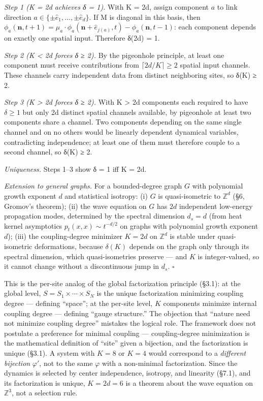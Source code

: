 \documentclass[
  11pt,
]{article}
\begin{document}
\emph{Step 1 (K = 2d achieves δ = 1).} With K = 2d, assign component
\(a\) to link direction
\(a \in \{\pm\hat{e}_1, \ldots, \pm\hat{e}_d\}\). If M is diagonal in
this basis, then
\(\phi_a(\mathbf{n}, t+1) = \mu_a \cdot \phi_a(\mathbf{n} + \hat{e}_{j(a)}, t) - \phi_a(\mathbf{n}, t-1)\):
each component depends on exactly one spatial input. Therefore δ(2d) =
1.

\emph{Step 2 (K \textless{} 2d forces δ ≥ 2).} By the pigeonhole
principle, at least one component must receive contributions from
\(\lceil 2d/K \rceil \geq 2\) spatial input channels. These channels
carry independent data from distinct neighboring sites, so δ(K) ≥ 2.

\emph{Step 3 (K \textgreater{} 2d forces δ ≥ 2).} With K \textgreater{}
2d components each required to have \(\delta \geq 1\) but only 2d
distinct spatial channels available, by pigeonhole at least two
components share a channel. Two components depending on the same single
channel and on no others would be linearly dependent dynamical
variables, contradicting independence; at least one of them must
therefore couple to a second channel, so δ(K) ≥ 2.

\emph{Uniqueness.} Steps 1--3 show δ = 1 iff K = 2d.

\emph{Extension to general graphs.} For a bounded-degree graph \(G\)
with polynomial growth exponent \(d\) and statistical isotropy: (i)
\(G\) is quasi-isometric to \(\mathbb{Z}^d\) (§6, Gromov's theorem);
(ii) the wave equation on \(G\) has \(2d\) independent low-energy
propagation modes, determined by the spectral dimension \(d_s = d\)
(from heat kernel asymptotics \(p_t(x,x) \sim t^{-d/2}\) on graphs with
polynomial growth exponent \(d\)); (iii) the coupling-degree minimizer
\(K = 2d\) on \(\mathbb{Z}^d\) is stable under quasi-isometric
deformations, because \(\delta(K)\) depends on the graph only through
its spectral dimension, which quasi-isometries preserve --- and \(K\) is
integer-valued, so it cannot change without a discontinuous jump in
\(d_s\). \(\square\)

This is the per-site analog of the global factorization principle
(§3.1): at the global level, \(S = S_1 \times \cdots \times S_N\) is the
unique factorization minimizing coupling degree --- defining ``space'';
at the per-site level, \(K\) components minimize internal coupling
degree --- defining ``gauge structure.'' The objection that ``nature
need not minimize coupling degree'' mistakes the logical role. The
framework does not postulate a preference for minimal coupling ---
coupling-degree minimization is the mathematical definition of ``site''
given a bijection, and the factorization is unique (§3.1). A system with
\(K = 8\) or \(K = 4\) would correspond to a \emph{different bijection}
\(\varphi'\), not to the same \(\varphi\) with a non-minimal
factorization. Since the dynamics is selected by center independence,
isotropy, and linearity (§7.1), and its factorization is unique,
\(K = 2d = 6\) is a theorem about the wave equation on \(\mathbb{Z}^3\),
not a selection rule.
\end{document}
